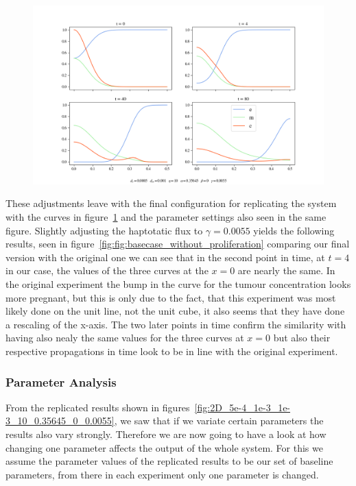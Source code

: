 \begin{figure}[h]
    \centering
    \includegraphics[width=\textwidth]{resources/images/basecase_without_proliferation.png}
    \label{fig:basecase_without_proliferation}
\end{figure}

These adjustments leave with the final configuration for replicating the system with the curves in figure~\ref{fig:basecase_without_proliferation} and the parameter settings also seen in the same figure.
Slightly adjusting the haptotatic flux to $\gamma=0.0055$ yields the following results, seen in figure~\ref{fig:fig:basecase_without_proliferation} comparing our final version with the original one we can see that in the second point in time, at $t=4$ in our case, the values of the three curves at the $x=0$ are nearly the same. In the original experiment the bump in the curve for the tumour concentration looks more pregnant, but this is only due to the fact, that this experiment was most likely done on the unit line, not the unit cube, it also seems that they have done a rescaling of the x-axis. The two later points in time confirm the similarity with having also nealy the same values for the three curves at $x=0$ but also their respective propagations in time look to be in line with the original experiment. 



\subsubsection{Parameter Analysis}
From the replicated results shown in figures~\ref{fig:2D_5e-4_1e-3_1e-3_10_0.35645_0_0.0055}, we saw that if we variate certain parameters the results also vary strongly. Therefore we are now going to have a look at how changing one parameter affects the output of the whole system. For this we assume the parameter values of the replicated results to be our set of baseline parameters, from there in each experiment only one parameter is changed. 
